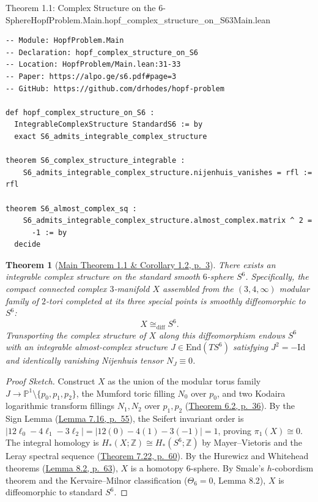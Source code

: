 \documentclass[10pt]{article}
\newtheorem{theorem}{Theorem}[section]
\newcommand{\dbZ}{\mathbb{Z}}
\newcommand{\dbP}{\mathbb{P}}
\gdef\hashchar{#}
\newcommand{\paperref}[2]{\href{https://alpo.ge/s6.pdf\hashchar page=#1}{#2}}
\begin{document}
\begin{comparativeblock}{Theorem 1.1: Complex Structure on the 6-Sphere}{HopfProblem.Main.hopf_complex_structure_on_S6}{3}{Main.lean}
\begin{verbatim}
-- Module: HopfProblem.Main
-- Declaration: hopf_complex_structure_on_S6
-- Location: HopfProblem/Main.lean:31-33
-- Paper: https://alpo.ge/s6.pdf#page=3
-- GitHub: https://github.com/drhodes/hopf-problem

def hopf_complex_structure_on_S6 :
  IntegrableComplexStructure StandardS6 := by
  exact S6_admits_integrable_complex_structure

theorem S6_complex_structure_integrable :
    S6_admits_integrable_complex_structure.nijenhuis_vanishes = rfl := rfl

theorem S6_almost_complex_sq :
    S6_admits_integrable_complex_structure.almost_complex.matrix ^ 2 =
      -1 := by
  decide
\end{verbatim}
\tcblower
\begin{theorem}[\paperref{3}{Main Theorem 1.1 \& Corollary 1.2, p.~3}]\label{thm:apex-1}
There exists an integrable complex structure on the standard smooth $6$-sphere $S^6$.
Specifically, the compact connected complex $3$-manifold $X$ assembled from the $(3,4,\infty)$ modular family of $2$-tori completed at its three special points is smoothly diffeomorphic to $S^6$:
\[
X \cong_{\mathrm{diff}} S^6.
\]
Transporting the complex structure of $X$ along this diffeomorphism endows $S^6$ with an integrable almost-complex structure $J \in \mathrm{End}(TS^6)$ satisfying $J^2 = -\mathrm{Id}$ and identically vanishing Nijenhuis tensor $N_J \equiv 0$.
\end{theorem}
\begin{proof}[Proof Sketch]
Construct $X$ as the union of the modular torus family $J \to \dbP^1 \setminus \{p_0,p_1,p_2\}$, the Mumford toric filling $N_0$ over $p_0$, and two Kodaira logarithmic transform fillings $N_1, N_2$ over $p_1, p_2$ (\paperref{36}{Theorem 6.2, p.~36}).
By the Sign Lemma (\paperref{55}{Lemma 7.16, p.~55}), the Seifert invariant order is $|12\ell_0 - 4\ell_1 - 3\ell_2| = |12(0) - 4(1) - 3(-1)| = 1$, proving $\pi_1(X) \cong 0$.
The integral homology is $H_*(X;\dbZ) \cong H_*(S^6;\dbZ)$ by Mayer--Vietoris and the Leray spectral sequence (\paperref{60}{Theorem 7.22, p.~60}).
By the Hurewicz and Whitehead theorems (\paperref{63}{Lemma 8.2, p.~63}), $X$ is a homotopy $6$-sphere.
By Smale's $h$-cobordism theorem and the Kervaire--Milnor classification ($\Theta_6 = 0$, Lemma 8.2), $X$ is diffeomorphic to standard $S^6$.
\end{proof}
\end{comparativeblock}
\end{document}
